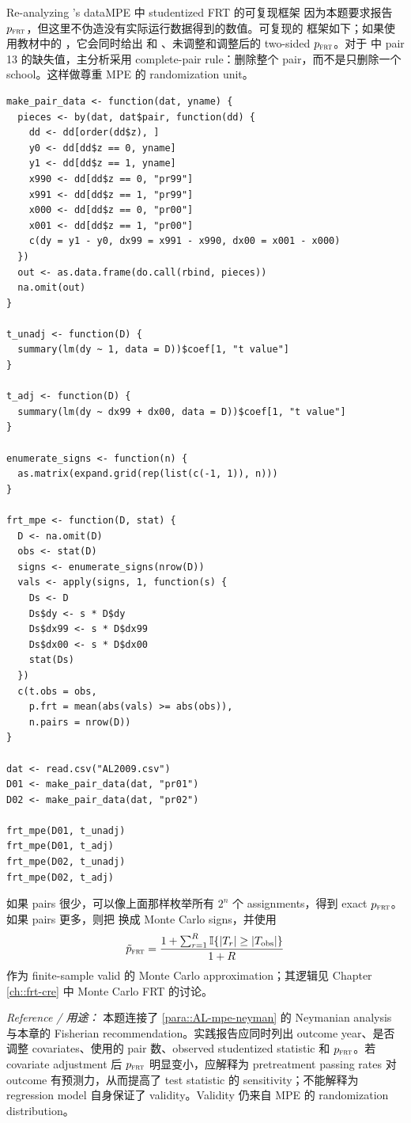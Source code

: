 \begin{exercisesolution}{Re-analyzing \citet{angrist2009effects}'s data}{MPE 中 studentized FRT 的可复现框架}
因为本题要求报告 $p_{\textsc{frt}}$，但这里不伪造没有实际运行数据得到的数值。可复现的  框架如下；如果使用教材中的 ，它会同时给出  和 、未调整和调整后的 two-sided $p_{\textsc{frt}}$。对于  中 pair 13 的缺失值，主分析采用 complete-pair rule：删除整个 pair，而不是只删除一个 school。这样做尊重 MPE 的 randomization unit。
\begin{lstlisting}
make_pair_data <- function(dat, yname) {
  pieces <- by(dat, dat$pair, function(dd) {
    dd <- dd[order(dd$z), ]
    y0 <- dd[dd$z == 0, yname]
    y1 <- dd[dd$z == 1, yname]
    x990 <- dd[dd$z == 0, "pr99"]
    x991 <- dd[dd$z == 1, "pr99"]
    x000 <- dd[dd$z == 0, "pr00"]
    x001 <- dd[dd$z == 1, "pr00"]
    c(dy = y1 - y0, dx99 = x991 - x990, dx00 = x001 - x000)
  })
  out <- as.data.frame(do.call(rbind, pieces))
  na.omit(out)
}

t_unadj <- function(D) {
  summary(lm(dy ~ 1, data = D))$coef[1, "t value"]
}

t_adj <- function(D) {
  summary(lm(dy ~ dx99 + dx00, data = D))$coef[1, "t value"]
}

enumerate_signs <- function(n) {
  as.matrix(expand.grid(rep(list(c(-1, 1)), n)))
}

frt_mpe <- function(D, stat) {
  D <- na.omit(D)
  obs <- stat(D)
  signs <- enumerate_signs(nrow(D))
  vals <- apply(signs, 1, function(s) {
    Ds <- D
    Ds$dy <- s * D$dy
    Ds$dx99 <- s * D$dx99
    Ds$dx00 <- s * D$dx00
    stat(Ds)
  })
  c(t.obs = obs,
    p.frt = mean(abs(vals) >= abs(obs)),
    n.pairs = nrow(D))
}

dat <- read.csv("AL2009.csv")
D01 <- make_pair_data(dat, "pr01")
D02 <- make_pair_data(dat, "pr02")

frt_mpe(D01, t_unadj)
frt_mpe(D01, t_adj)
frt_mpe(D02, t_unadj)
frt_mpe(D02, t_adj)
\end{lstlisting}

如果 pairs 很少，可以像上面那样枚举所有 $2^n$ 个 assignments，得到 exact $p_{\textsc{frt}}$。如果 pairs 更多，则把  换成 Monte Carlo signs，并使用
\[
\tilde p_{\textsc{frt}}=
\frac{1+\sum_{r=1}^R \mathbb{I}\{|T_r|\geq |T_{\mathrm{obs}}|\}}{1+R}
\]
作为 finite-sample valid 的 Monte Carlo approximation；其逻辑见 Chapter \ref{ch::frt-cre} 中 Monte Carlo FRT 的讨论。

\emph{Reference / 用途：} 本题连接了 \cref{para::AL-mpe-neyman} 的 Neymanian analysis 与本章的 Fisherian recommendation。实践报告应同时列出 outcome year、是否调整 covariates、使用的 pair 数、observed studentized statistic 和 $p_{\textsc{frt}}$。若 covariate adjustment 后 $p_{\textsc{frt}}$ 明显变小，应解释为 pretreatment passing rates 对 outcome 有预测力，从而提高了 test statistic 的 sensitivity；不能解释为 regression model 自身保证了 validity。Validity 仍来自 MPE 的 randomization distribution。
\end{exercisesolution}

